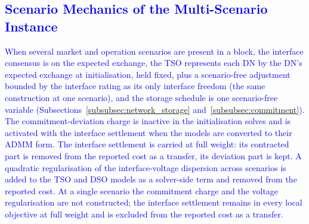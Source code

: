 \documentclass[preprint,12pt]{elsarticle}
\begin{document}
\begin{algorithm}[htbp!]
    \;
\end{algorithm}

\subsection{\textcolor{blue}{Scenario Mechanics of the Multi-Scenario Instance}}
\label{app:admm_updated_scenarios}

\textcolor{blue}{
    When several market and operation scenarios are present in a block, the interface consensus is on the expected exchange, the TSO represents each DN by the DN's expected exchange at initialisation, held fixed, plus a scenario-free adjustment bounded by the interface rating as its only interface freedom (the same construction at one scenario), and the storage schedule is one scenario-free variable (Subsections~\ref{subsubsec:network_storage} and~\ref{subsubsec:commitment}). The commitment-deviation charge is inactive in the initialisation solves and is activated with the interface settlement when the models are converted to their ADMM form. The interface settlement is carried at full weight: its contracted part is removed from the reported cost as a transfer, its deviation part is kept. A quadratic regularisation of the interface-voltage dispersion across scenarios is added to the TSO and DSO models as a solver-side term and removed from the reported cost. At a single scenario the commitment charge and the voltage regularisation are not constructed; the interface settlement remains in every local objective at full weight and is excluded from the reported cost as a transfer.
}
\end{document}
